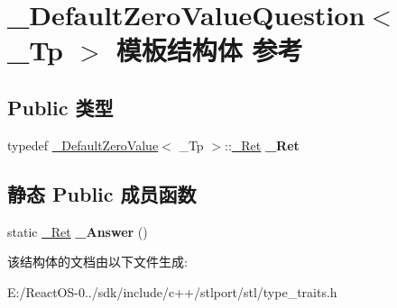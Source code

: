 \hypertarget{struct___default_zero_value_question}{}\section{\+\_\+\+Default\+Zero\+Value\+Question$<$ \+\_\+\+Tp $>$ 模板结构体 参考}
\label{struct___default_zero_value_question}
\subsection*{Public 类型}
\begin{DoxyCompactItemize}
\item 
\mbox{\label{struct___default_zero_value_question_a1b7a482bf073f2e820dca6ef61b829d7}} 
typedef \hyperlink{struct___default_zero_value}{\+\_\+\+Default\+Zero\+Value}$<$ \+\_\+\+Tp $>$\+::\hyperlink{struct____true__type}{\+\_\+\+Ret} {\bfseries \+\_\+\+Ret}
\end{DoxyCompactItemize}
\subsection*{静态 Public 成员函数}
\begin{DoxyCompactItemize}
\item 
\mbox{\label{struct___default_zero_value_question_afddc12fb4a8e5b1934e97c5444c19512}} 
static \hyperlink{struct____true__type}{\+\_\+\+Ret} {\bfseries \+\_\+\+Answer} ()
\end{DoxyCompactItemize}


该结构体的文档由以下文件生成\+:\begin{DoxyCompactItemize}
\item 
E\+:/\+React\+O\+S-\/0../sdk/include/c++/stlport/stl/type\+\_\+traits.\+h\end{DoxyCompactItemize}
